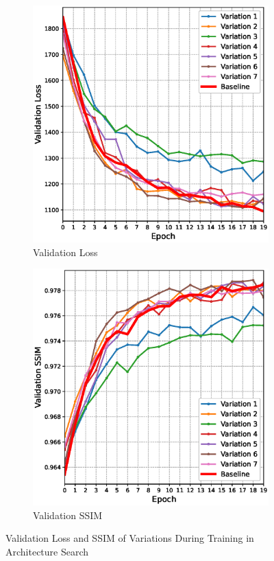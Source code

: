 \begin{figure}
    \centering
    \begin{subfigure}{0.49\textwidth}
        \centering
        \includegraphics[width=\linewidth]{figures/architecture_search/architecture_search_loss.eps}
        \caption{Validation Loss}
        \label{fig:validation_losses}
    \end{subfigure}%
    \begin{subfigure}{0.49\textwidth}
        \centering
        \includegraphics[width=\linewidth]{figures/architecture_search/architecture_search_ssim.eps}
        \caption{Validation SSIM}
        \label{fig:validation_ssim}
    \end{subfigure}
    \caption{Validation Loss and SSIM of Variations During Training in Architecture Search}
    \label{fig:test}
\end{figure}

